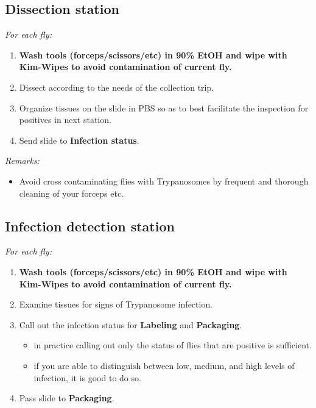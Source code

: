 \documentclass[letterpaper]{scrreprt}
\begin{document}
\subsection{Dissection station}\label{dissection-station}

\emph{For each fly:}

\begin{enumerate}
\def\labelenumi{\arabic{enumi}.}
\itemsep1pt\parskip0pt
\item
  \textbf{Wash tools (forceps/scissors/etc) in 90\% EtOH and wipe with
  Kim-Wipes to avoid contamination of current fly.}
\item
  Dissect according to the needs of the collection trip.
\item
  Organize tissues on the slide in PBS so as to best facilitate the
  inspection for positives in next station.
\item
  Send slide to \textbf{Infection status}.
\end{enumerate}

\emph{Remarks:}

\begin{itemize}
\itemsep1pt\parskip0pt
\item
  Avoid cross contaminating flies with Trypanosomes by frequent and
  thorough cleaning of your forceps etc.
\end{itemize}

\subsection{Infection detection
station}\label{infection-detection-station}

\emph{For each fly:}

\begin{enumerate}
\def\labelenumi{\arabic{enumi}.}
\itemsep1pt\parskip0pt
\item
  \textbf{Wash tools (forceps/scissors/etc) in 90\% EtOH and wipe with
  Kim-Wipes to avoid contamination of current fly.}
\item
  Examine tissues for signs of Trypanosome infection.
\item
  Call out the infection status for \textbf{Labeling} and
  \textbf{Packaging}.

  \begin{itemize}
  \itemsep1pt\parskip0pt
  \item
    in practice calling out only the status of flies that are positive
    is sufficient.
  \item
    if you are able to distinguish between low, medium, and high levels
    of infection, it is good to do so.
  \end{itemize}
\item
  Pass slide to \textbf{Packaging}.
\end{enumerate}
\end{document}
